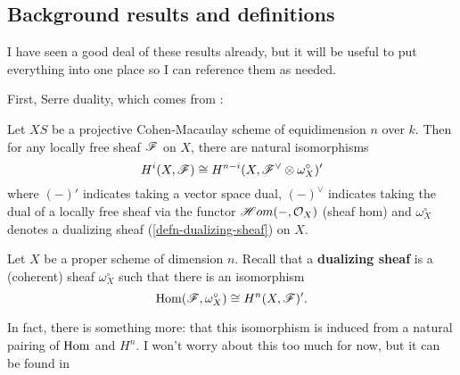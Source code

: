 \documentclass[12pt]{article}
\begin{document}
\subsection{Background results and definitions}
I have seen a good deal of these results already, but it will be useful to put everything into one place so I can reference them as needed.

First, Serre duality, which comes from \cite{hartshorneAG}:
\begin{thm}\label{thm-serre-duality}
	Let $XS$ be a projective Cohen-Macaulay scheme of equidimension $n$ over $k$. Then for any locally free sheaf $\mathscr{F}$ on $X$, 
	there are natural isomorphisms
	\[H^i(X,\mathscr{F})\cong H^{n-i}(X,\mathscr{F}^\vee\otimes \omega_X^\circ)'\]
	where $(-)'$ indicates taking a vector space dual, $(-)^\vee$ indicates taking the dual of a locally free sheaf via the functor
	$\mathscr Hom(-,\mathcal{O}_X)$ (sheaf hom) and $\omega_X^\circ$ denotes a dualizing sheaf (\ref{defn-dualizing-sheaf}) on $X$.
\end{thm}

\begin{defn}\label{defn-dualizing-sheaf}
	Let $X$ be a proper scheme of dimension $n$. Recall that a \textbf{dualizing sheaf} is a (coherent) sheaf $\omega_X^\circ$ such that there is an isomorphism 
	\[\operatorname{Hom}(\mathscr{F},\omega_X^\circ)\cong H^n(X,\mathscr{F})'.\]
\end{defn}
\begin{rmk}
	In fact, there is something more: that this isomorphism is induced from a natural pairing of $\operatorname{Hom}$ and $H^n$. I won't worry 
	about this too much for now, but it can be found in \cite[p. 240]{hartshorneAG}
\end{rmk}
\end{document}
